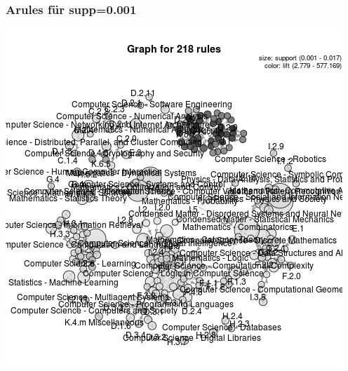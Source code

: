 \documentclass[12pt, xcolor=table]{beamer}
\begin{document}
\begin{frame}
    \frametitle{Arules für supp=0.001}
    \begin{center}
		\includegraphics[scale=0.5]{../../visual/graph_218rules.png}
	\end{center}
\end{frame}
\end{document}
